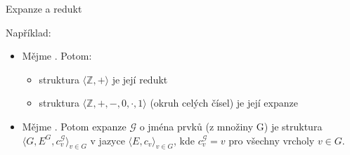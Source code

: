 \documentclass{beamer}
\begin{document}
\begin{frame}{Expanze a redukt}
 

    \medskip
    Například:
    \begin{itemize}
        \item Mějme . Potom: 
        \begin{itemize}
            \item struktura $\langle \mathbb Z,+\rangle$ je její redukt
            \item struktura $\langle\mathbb Z,+,-,0,\cdot,1\rangle$ (\alert{okruh} celých čísel) je její expanze
        \end{itemize}
    
        \item Mějme . Potom \alert{expanze $\mathcal G$ o jména prvků} (z množiny G) je struktura $\langle G, E^G,c_v^\mathcal G\rangle_{v\in G}$ v jazyce $\langle E,c_v\rangle_{v\in G}$, kde $c_v^\mathcal G=v$ pro všechny vrcholy $v\in G$.
    \end{itemize}

\end{frame}
\end{document}

